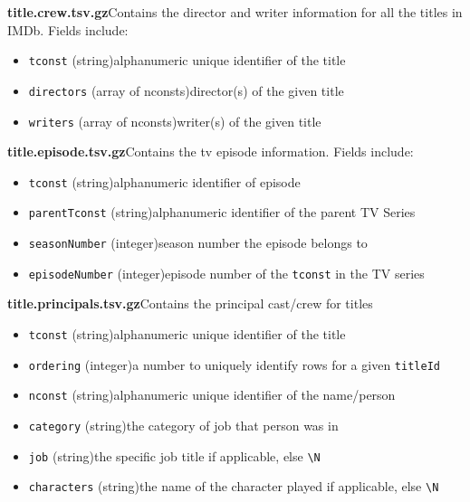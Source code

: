 \documentclass[11pt]{article}
\begin{document}
    \textbf{title.crew.tsv.gz}\textemdash Contains the director and writer information for all the titles in IMDb. Fields include:

    \begin{itemize}
        \item \texttt{tconst} (string)\textemdash alphanumeric unique identifier of the title
        \item \texttt{directors} (array of nconsts)\textemdash director(s) of the given title
        \item \texttt{writers} (array of nconsts)\textemdash writer(s) of the given title
    \end{itemize}

    \newpage

    \textbf{title.episode.tsv.gz}\textemdash Contains the tv episode information.
    Fields include:

    \begin{itemize}
        \item \texttt{tconst} (string)\textemdash alphanumeric identifier of episode
        \item \texttt{parentTconst} (string)\textemdash alphanumeric identifier of the parent TV Series
        \item \texttt{seasonNumber} (integer)\textemdash season number the episode belongs to
        \item \texttt{episodeNumber} (integer)\textemdash episode number of the \texttt{tconst} in the TV series
    \end{itemize}

    \textbf{title.principals.tsv.gz}\textemdash Contains the principal cast/crew for titles

    \begin{itemize}
        \item \texttt{tconst} (string)\textemdash alphanumeric unique identifier of the title
        \item \texttt{ordering} (integer)\textemdash a number to uniquely identify rows for a given \texttt{titleId}
        \item \texttt{nconst} (string)\textemdash alphanumeric unique identifier of the name/person
        \item \texttt{category} (string)\textemdash the category of job that person was in
        \item \texttt{job} (string)\textemdash the specific job title if applicable, else \texttt{\textbackslash N}
        \item \texttt{characters} (string)\textemdash the name of the character played if applicable, else \texttt{\textbackslash N}
    \end{itemize}
\end{document}
